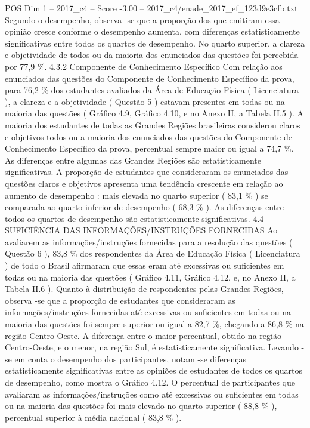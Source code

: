 \begin{textsample}{POS Dim 1 – 2017\_c4 – Score -3.00 – 2017\_c4/enade\_2017\_ef\_123d9e3cfb.txt}
Segundo o desempenho, observa -se que a proporção dos que emitiram essa opinião cresce conforme o desempenho aumenta, com diferenças estatisticamente significativas entre todos os quartos de desempenho.
No quarto superior, a clareza e objetividade de todos ou da maioria dos enunciados das questões foi percebida por 77,9 \%. 4.3.2 Componente de Conhecimento Específico Com relação aos enunciados das questões do Componente de Conhecimento Específico da prova, para 76,2 \% dos estudantes avaliados da Área de Educação Física ( Licenciatura ), a clareza e a objetividade ( Questão 5 ) estavam presentes em todas ou na maioria das questões ( Gráfico 4.9, Gráfico 4.10, e no Anexo II, a Tabela II.5 ).
A maioria dos estudantes de todas as Grandes Regiões brasileiras considerou claros e objetivos todos ou a maioria dos enunciados das questões do Componente de Conhecimento Específico da prova, percentual sempre maior ou igual a 74,7 \%.
As diferenças entre algumas das Grandes Regiões são estatisticamente significativas.
A proporção de estudantes que consideraram os enunciados das questões claros e objetivos apresenta uma tendência crescente em relação ao aumento de desempenho : mais elevada no quarto superior ( 83,1 \% ) se comparada ao quarto inferior de desempenho ( 68,3 \% ).
As diferenças entre todos os quartos de desempenho são estatisticamente significativas. 4.4 SUFICIÊNCIA DAS INFORMAÇÕES/INSTRUÇÕES FORNECIDAS Ao avaliarem as informações/instruções fornecidas para a resolução das questões ( Questão 6 ), 83,8 \% dos respondentes da Área de Educação Física ( Licenciatura ) de todo o Brasil afirmaram que essas eram até excessivas ou suficientes em todas ou na maioria das questões ( Gráfico 4.11, Gráfico 4.12, e, no Anexo II, a Tabela II.6 ).
Quanto à distribuição de respondentes pelas Grandes Regiões, observa -se que a proporção de estudantes que consideraram as informações/instruções fornecidas até excessivas ou suficientes em todas ou na maioria das questões foi sempre superior ou igual a 82,7 \%, chegando a 86,8 \% na região Centro-Oeste.
A diferença entre o maior percentual, obtido na região Centro-Oeste, e o menor, na região Sul, é estatisticamente significativa.
Levando -se em conta o desempenho dos participantes, notam -se diferenças estatisticamente significativas entre as opiniões de estudantes de todos os quartos de desempenho, como mostra o Gráfico 4.12.
O percentual de participantes que avaliaram as informações/instruções como até excessivas ou suficientes em todas ou na maioria das questões foi mais elevado no quarto superior ( 88,8 \% ), percentual superior à média nacional ( 83,8 \% ).

\end{textsample}
